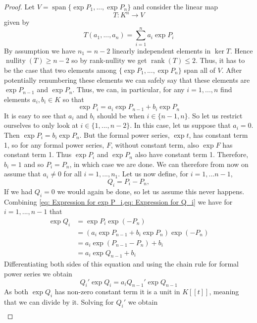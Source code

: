\documentclass{article}
\DeclareMathOperator{\rank}{rank}
\DeclareMathOperator{\nullity}{nullity}
\newcommand{\Span}{\operatorname{span}}
\begin{document}
\begin{proof}
    Let $V = \Span \{ \exp P_1,...,\exp P_n\}$ and consider the linear map $$T : K^n \to V$$ given by 
    $$T(a_1, ..., a_n) = \sum_{i=1}^n a_i \exp P_i$$
    By assumption we have $n_1 = n - 2$ linearly independent elements in $\ker T$. Hence $\nullity (T) \geq n-2$ so by rank-nullity we get $\rank (T) \leq 2$. Thus, it has to be the case that two elements among $\{\exp P_1,...,\exp P_n \}$ span all of $V$. After potentially renumbering these elements we can safely say that these elements are $\exp{P_{n-1}}$ and $\exp{P_{n}}$. Thus, we can, in particular, for any $i = 1, ..., n$ find elements $a_i, b_i \in K$ so that 
    \begin{equation} \label{eq: Expression for exp P_i}
        \exp P_i = a_i \exp P_{n-1} + b_i \exp P_n
    \end{equation}
    It is easy to see that $a_i$ and $b_i$ should be when $i \in \{n-1, n\}$. So let us restrict ourselves to only look at $i \in \{1, ..., n-2\}$. In this case, let us suppose that $a_i = 0$. Then $\exp P_i = b_i \exp P_n$. But the formal power series, $\exp t$, has constant term 1, so for any formal power series, $F$, without constant term, also $\exp F$ has constant term 1. Thus $\exp P_i$ and $\exp P_n$ also have constant term 1. Therefore, $b_i = 1$ and so $P_i = P_n$, in which case we are done. We can therefore from now on assume that $a_i \neq 0$ for all $i = 1, ..., n_1$. Let us now define, for $i = 1, ... n-1$,
    \begin{equation}\label{eq: Expression for Q_i}
        Q_i = P_i - P_n,
    \end{equation}
    If we had $Q_i = 0$ we would again be done, so let us assume this never happens. Combining \cref{eq: Expression for exp P_i,eq: Expression for Q_i} we have for $i = 1, ..., n-1$ that
    \begin{align*}
        \exp Q_i &= \exp P_i \exp (-P_n) \\
        &= (a_i \exp P_{n-1} + b_i \exp P_n) \exp (-P_n) \\
        &= a_i \exp (P_{n-1} - P_n) + b_i \\
        &= a_i \exp Q_{n-1} + b_i
    \end{align*}
    Differentiating both sides of this equation and using the chain rule for formal power series we obtain
    $$Q_i' \exp Q_i = a_i Q_{n-1}' \exp Q_{n-1}$$
    As both $\exp Q_i$ has non-zero constant term it is a unit in $K[[t]]$, meaning that we can divide by it. Solving for $Q_i'$ we obtain
    \begin{align}\label{eq: Expression for Q_i prime}

\end{align}
\end{proof}
\end{document}
